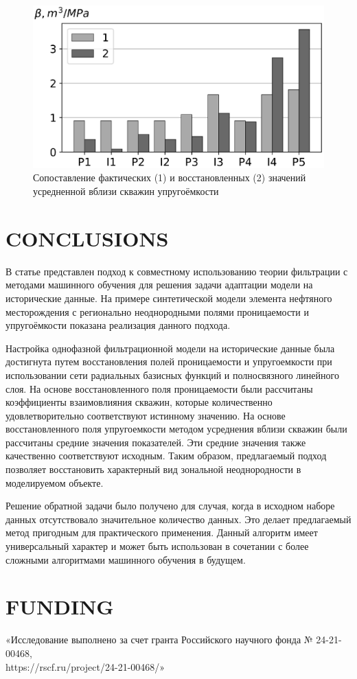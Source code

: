 \documentclass{article}
\begin{document}
\begin{figure}
	\centering
	\includegraphics[width=0.7\linewidth]{images/fig7.eps}
	\caption{Сопоставление фактических (1) и восстановленных (2) значений усредненной вблизи скважин упругоёмкости}
	\label{fig:hist}
\end{figure}


\section{CONCLUSIONS}
В статье представлен подход к совместному использованию теории фильтрации с методами машинного обучения для решения задачи адаптации модели на исторические данные. На примере синтетической модели элемента нефтяного месторождения с регионально неоднородными полями проницаемости и упругоёмкости показана реализация данного подхода.

Настройка однофазной фильтрационной модели на исторические данные была достигнута путем восстановления полей проницаемости и упругоемкости при использовании сети радиальных базисных функций и полносвязного линейного слоя. На основе восстановленного поля проницаемости были рассчитаны коэффициенты взаимовлияния скважин, которые количественно удовлетворительно соответствуют истинному значению. На основе восстановленного поля упругоемкости методом усреднения вблизи скважин были рассчитаны средние значения показателей. Эти средние значения также качественно соответствуют исходным. Таким образом, предлагаемый подход позволяет восстановить характерный вид зональной неоднородности в моделируемом объекте.

Решение обратной задачи было получено для случая, когда в исходном наборе данных отсутствовало значительное количество данных. Это делает предлагаемый метод пригодным для практического применения. Данный алгоритм имеет универсальный характер и может быть использован в сочетании с более сложными алгоритмами машинного обучения в будущем.

\section{FUNDING}
«Исследование выполнено за счет гранта Российского научного фонда № 24-21-00468,
 \\ https://rscf.ru/project/24-21-00468/»
 
\end{document}
